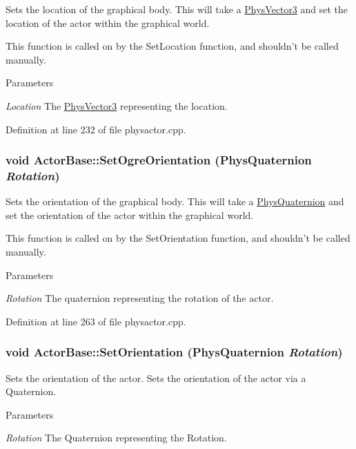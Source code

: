 Sets the location of the graphical body. This will take a \hyperlink{classPhysVector3}{PhysVector3} and set the location of the actor within the graphical world. \par
 This function is called on by the SetLocation function, and shouldn't be called manually. 
\begin{DoxyParams}{Parameters}
\item[{\em Location}]The \hyperlink{classPhysVector3}{PhysVector3} representing the location. \end{DoxyParams}


Definition at line 232 of file physactor.cpp.\hypertarget{classActorBase_a55f45703e3d9b8de0cd07b23bd9460bf}{
\subsubsection[{SetOgreOrientation}]{\setlength{\rightskip}{0pt plus 5cm}void ActorBase::SetOgreOrientation ({\bf PhysQuaternion} {\em Rotation})}}
\label{dd/d7b/classActorBase_a55f45703e3d9b8de0cd07b23bd9460bf}


Sets the orientation of the graphical body. This will take a \hyperlink{classPhysQuaternion}{PhysQuaternion} and set the orientation of the actor within the graphical world. \par
 This function is called on by the SetOrientation function, and shouldn't be called manually. 
\begin{DoxyParams}{Parameters}
\item[{\em Rotation}]The quaternion representing the rotation of the actor. \end{DoxyParams}


Definition at line 263 of file physactor.cpp.\hypertarget{classActorBase_a5fe558ca0a88061615cda52a4dc5bf66}{
\subsubsection[{SetOrientation}]{\setlength{\rightskip}{0pt plus 5cm}void ActorBase::SetOrientation ({\bf PhysQuaternion} {\em Rotation})}}
\label{dd/d7b/classActorBase_a5fe558ca0a88061615cda52a4dc5bf66}


Sets the orientation of the actor. Sets the orientation of the actor via a Quaternion. 
\begin{DoxyParams}{Parameters}
\item[{\em Rotation}]The Quaternion representing the Rotation. \end{DoxyParams}


